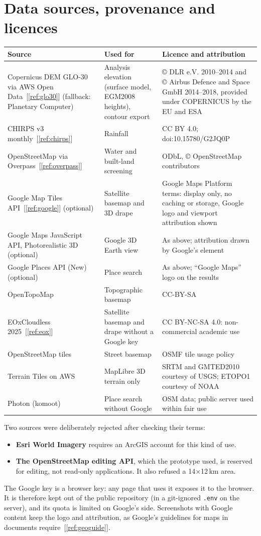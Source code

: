 \documentclass[11pt,a4paper]{article}
\newcommand{\code}[1]{\texttt{#1}}
\begin{document}
\section{Data sources, provenance and licences}
\label{sec:data}
\begin{tabularx}{\linewidth}{@{}L{40mm}L{34mm}Y@{}}
\toprule
\textbf{Source} & \textbf{Used for} & \textbf{Licence and attribution}\\
\midrule
Copernicus DEM GLO-30 via AWS Open Data~[\ref{ref:glo30}] (fallback: Planetary Computer) & Analysis elevation (surface model, EGM2008 heights), contour export & \copyright{} DLR e.V. 2010--2014 and \copyright{} Airbus Defence and Space GmbH 2014--2018, provided under COPERNICUS by the EU and ESA\\
CHIRPS v3 monthly~[\ref{ref:chirps}] & Rainfall & CC BY 4.0; doi:10.15780/G2JQ0P\\
OpenStreetMap via Overpass~[\ref{ref:overpass}] & Water and built-land screening & ODbL, \copyright{} OpenStreetMap contributors\\
Google Map Tiles API~[\ref{ref:google}] (optional) & Satellite basemap and 3D drape & Google Maps Platform terms: display only, no caching or storage, Google logo and viewport attribution shown\\
Google Maps JavaScript API, Photorealistic 3D (optional) & Google 3D Earth view & As above; attribution drawn by Google's element\\
Google Places API (New) (optional) & Place search & As above; ``Google Maps'' logo on the results\\
OpenTopoMap & Topographic basemap & CC-BY-SA\\
EOxCloudless 2025~[\ref{ref:eox}] & Satellite basemap and drape without a Google key & CC BY-NC-SA 4.0: non-commercial academic use\\
OpenStreetMap tiles & Street basemap & OSMF tile usage policy\\
Terrain Tiles on AWS & MapLibre 3D terrain only & SRTM and GMTED2010 courtesy of USGS; ETOPO1 courtesy of NOAA\\
Photon (komoot) & Place search without Google & OSM data; public server used within fair use\\
\bottomrule
\end{tabularx}

Two sources were deliberately rejected after checking their terms:
\begin{itemize}
\item \textbf{Esri World Imagery} requires an ArcGIS account for this kind of use.
\item \textbf{The OpenStreetMap editing API}, which the prototype used, is reserved for editing, not read-only applications. It also refused a 14$\times$12\,km area.
\end{itemize}
The Google key is a browser key: any page that uses it exposes it to the browser. It is therefore kept out of the public repository (in a git-ignored \code{.env} on the server), and its quota is limited on Google's side. Screenshots with Google content keep the logo and attribution, as Google's guidelines for maps in documents require~[\ref{ref:geoguide}].
\end{document}
